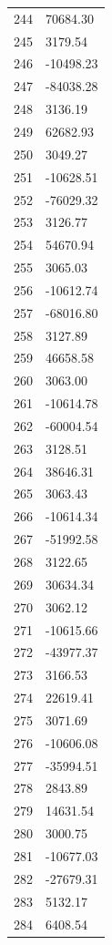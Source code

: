 \documentclass[a4paper,11pt]{article}
\begin{document}
\begin{center}
\begin{longtable}{|R{1.5cm}|R{2.6cm}|}
  244 &     70684.30 \\
  245 &      3179.54 \\
  246 &    -10498.23 \\
  247 &    -84038.28 \\
  248 &      3136.19 \\
  249 &     62682.93 \\
  250 &      3049.27 \\
  251 &    -10628.51 \\
  252 &    -76029.32 \\
  253 &      3126.77 \\
  254 &     54670.94 \\
  255 &      3065.03 \\
  256 &    -10612.74 \\
  257 &    -68016.80 \\
  258 &      3127.89 \\
  259 &     46658.58 \\
  260 &      3063.00 \\
  261 &    -10614.78 \\
  262 &    -60004.54 \\
  263 &      3128.51 \\
  264 &     38646.31 \\
  265 &      3063.43 \\
  266 &    -10614.34 \\
  267 &    -51992.58 \\
  268 &      3122.65 \\
  269 &     30634.34 \\
  270 &      3062.12 \\
  271 &    -10615.66 \\
  272 &    -43977.37 \\
  273 &      3166.53 \\
  274 &     22619.41 \\
  275 &      3071.69 \\
  276 &    -10606.08 \\
  277 &    -35994.51 \\
  278 &      2843.89 \\
  279 &     14631.54 \\
  280 &      3000.75 \\
  281 &    -10677.03 \\
  282 &    -27679.31 \\
  283 &      5132.17 \\
  284 &      6408.54 \\

\end{longtable}
\end{center}
\end{document}
